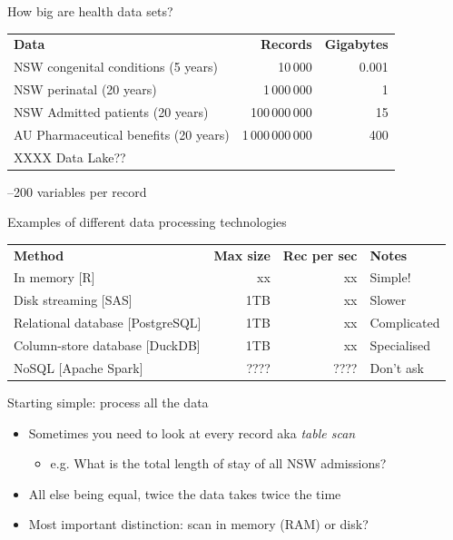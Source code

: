 \documentclass[aspectratio=169,12pt,usepdftitle=false]{beamer} %
\begin{document}

\begin{frame}{How big are health data sets?}
    \begin{tabular}{lrr}
	\textbf{Data} & \textbf{Records} & \textbf{Gigabytes} \\
	NSW congenital conditions (5 years)& 10\,000 & 0.001 \\
	NSW perinatal (20 years) & 1\,000\,000 & 1 \\
	NSW Admitted patients (20 years) & 100\,000\,000 & 15 \\
	AU Pharmaceutical benefits (20 years) & 1\,000\,000\,000 & 400 \\
	XXXX Data Lake?? \\
    \end{tabular}\par
    --200 variables per record
\end{frame}

\begin{frame}{Examples of different data processing technologies}
    \begin{tabular}{lrrl}
	\textbf{Method} & \textbf{Max size} & \textbf{Rec per sec} &
		\textbf{Notes} \\
	In memory [R] & xx & xx & Simple! \\
	Disk streaming [SAS] & 1TB & xx & Slower \\
	Relational database [PostgreSQL] & 1TB & xx & Complicated \\
	Column-store database [DuckDB] & 1TB & xx & Specialised \\
	NoSQL [Apache Spark] & ???? & ???? & Don't ask \\
    \end{tabular}
\end{frame}

\begin{frame}{Starting simple: process all the data}
    \begin{itemize}
	\item Sometimes you need to look at every record aka \emph{table scan}
	    \begin{itemize}
		\item e.g. What is the total length of stay of all NSW admissions?
	    \end{itemize}
	\item All else being equal, twice the data takes twice the time
	\item Most important distinction: scan in memory (RAM) or disk?
    \end{itemize}
\end{frame}
\end{document}
